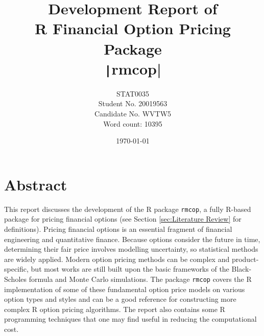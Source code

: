 \title{Development Report of\\R Financial Option Pricing Package\\\texttt|rmcop|}
\author{STAT0035\\Student No. 20019563\\Candidate No. WVTW5\\Word count: 10395}
\date{\today}

\maketitle
\newpage

\chapter*{Abstract}

This report discusses the development of the R package \texttt{rmcop}, a fully R-based package for pricing financial options (see Section \ref{sec:Literature Review} for definitions). Pricing financial options is an essential fragment of financial engineering and quantitative finance. Because options consider the future in time, determining their fair price involves modelling uncertainty, so statistical methods are widely applied. Modern option pricing methods can be complex and product-specific, but most works are still built upon the basic frameworks of the Black-Scholes formula and Monte Carlo simulations. The package \texttt{rmcop} covers the R implementation of some of these fundamental option price models on various option types and styles and can be a good reference for constructing more complex R option pricing algorithms. The report also contains some R programming techniques that one may find useful in reducing the computational cost.

\newpage
\tableofcontents
\newpage
